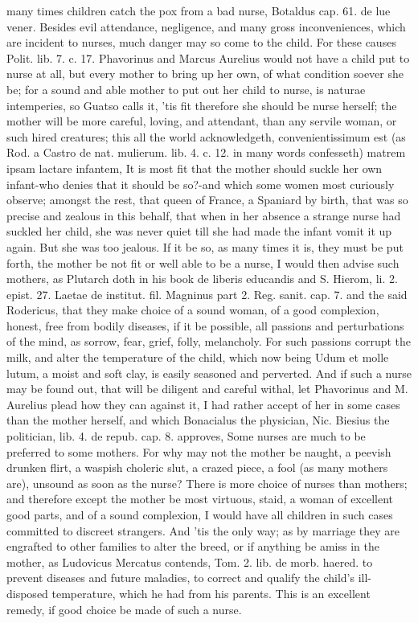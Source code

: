 {{many times children catch the pox from a bad nurse, Botaldus cap. 61.
de lue vener. Besides evil attendance, negligence, and many gross
inconveniences, which are incident to nurses, much danger may so come
to the child. For these causes \Aristotle Polit. lib. 7. c. 17.
Phavorinus and Marcus Aurelius would not have a child put to nurse at
all, but every mother to bring up her own, of what condition soever she
be; for a sound and able mother to put out her child to nurse, is
naturae intemperies, so Guatso calls it, 'tis fit therefore she
should be nurse herself; the mother will be more careful, loving, and
attendant, than any servile woman, or such hired creatures; this all
the world acknowledgeth, convenientissimum est (as Rod. a Castro de
nat. mulierum. lib. 4. c. 12. in many words confesseth) matrem ipsam
lactare infantem, It is most fit that the mother should suckle her own
infant-who denies that it should be so?-and which some women most
curiously observe; amongst the rest, that queen of France, a
Spaniard by birth, that was so precise and zealous in this behalf, that
when in her absence a strange nurse had suckled her child, she was
never quiet till she had made the infant vomit it up again. But she was
too jealous. If it be so, as many times it is, they must be put forth,
the mother be not fit or well able to be a nurse, I would then advise
such mothers, as Plutarch doth in his book de liberis educandis
and S. Hierom, li. 2. epist. 27. Laetae de institut. fil.
Magninus part 2. Reg. sanit. cap. 7. and the said Rodericus, that they
make choice of a sound woman, of a good complexion, honest, free from
bodily diseases, if it be possible, all passions and perturbations of
the mind, as sorrow, fear, grief, folly, melancholy. For such
passions corrupt the milk, and alter the temperature of the child,
which now being  Udum et molle lutum, a moist and soft clay, is
easily seasoned and perverted. And if such a nurse may be found out,
that will be diligent and careful withal, let Phavorinus and M.
Aurelius plead how they can against it, I had rather accept of her in
some cases than the mother herself, and which Bonacialus the physician,
Nic. Biesius the politician, lib. 4. de repub. cap. 8. approves,
Some nurses are much to be preferred to some mothers. For why may
not the mother be naught, a peevish drunken flirt, a waspish choleric
slut, a crazed piece, a fool (as many mothers are), unsound as soon as
the nurse? There is more choice of nurses than mothers; and therefore
except the mother be most virtuous, staid, a woman of excellent good
parts, and of a sound complexion, I would have all children in such
cases committed to discreet strangers. And 'tis the only way; as by
marriage they are engrafted to other families to alter the breed, or if
anything be amiss in the mother, as Ludovicus Mercatus contends, Tom.
2. lib. de morb. haered. to prevent diseases and future maladies, to
correct and qualify the child's ill-disposed temperature, which he had
from his parents. This is an excellent remedy, if good choice be made
of such a nurse.

}}
